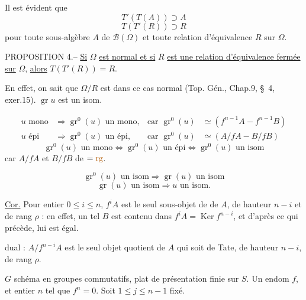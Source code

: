 Il est évident que
\[
T'(T(A))\supset A
\]
\[
T(T'(R))\supset R
\]
pour toute sous-algèbre $A$ de $\mathcal B(\Omega)$ et toute relation d'équivalence $R$ sur $\Omega$.

PROPOSITION 4.-- \uline{Si} $\Omega$ \uline{est normal et si} $R$ \uline{est une relation d'équivalence fermée sur} $\Omega$, \uline{alors} $T(T'(R))=R$.

En effet, on sait que $\Omega/R$ est dans ce cas normal (Top. Gén., Chap.9, \S\ 4, exer.15).
 $\operatorname{gr}u$ est un isom.

\[
\begin{aligned}
u\text{ mono}&\Longrightarrow\operatorname{gr}^0(u)\text{ un mono},&\text{car }\operatorname{gr}^0(u)&\simeq(f^{n-1}A-f^{n-1}B)\\
u\text{ épi}&\Longrightarrow\operatorname{gr}^0(u)\text{ un épi},&\text{car }\operatorname{gr}^0(u)&\simeq(A/fA-B/fB)
\end{aligned}
\]
\[
\operatorname{gr}^0(u)\text{ un mono}\Longleftrightarrow\operatorname{gr}^0(u)\text{ un épi}\Longleftrightarrow\operatorname{gr}^0(u)\text{ un isom}
\]
car $A/fA$ et $B/fB$ de \uline{$=\unsure{\operatorname{rg}}$}.

\[
\operatorname{gr}^0(u)\text{ un isom}\Longrightarrow\operatorname{gr}(u)\text{ un isom}
\]
\[
\operatorname{gr}(u)\text{ un isom}\Longrightarrow u\text{ un isom}.
\]

\uline{Cor.}  Pour \unsure{$\forall$} entier $0\leq i\leq n$, $f^iA$ est le seul sous-objet de   de $A$, de hauteur $n-i$ et de rang $\rho$ : en effet, un tel $B$ est contenu dans $f^iA=\operatorname{Ker}f^{n-i}$, et d'après ce qui précède, lui est égal.

 dual : $A/f^{n-i}A$ est le seul objet quotient de $A$ qui soit de Tate, de hauteur $n-i$, de rang $\rho$.


$G$ schéma en groupes commutatifs, plat  de présentation finie sur $S$. Un endom $f$, et entier $n$ tel que $f^n=0$. Soit $1\leq j\leq n-1$ fixé.

